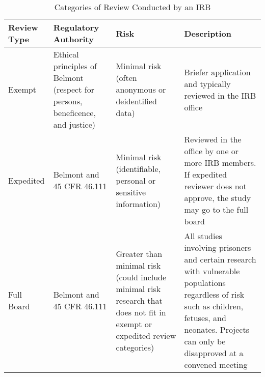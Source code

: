 \begin{table}

\caption{\label{tab:}Categories of Review Conducted by an IRB}
\centering
\begin{tabulary}{\ourtablewidth}{lLLL}
\hline
Review Type & Regulatory Authority & Risk & Description\\
\hline
Exempt & Ethical principles of Belmont (respect for persons, beneficence, and justice) & Minimal risk (often anonymous or deidentified data) & Briefer application and typically reviewed in the IRB office\\
\hline
Expedited & Belmont and 45 CFR 46.111 & Minimal risk (identifiable, personal or sensitive information) & Reviewed in the office by one or more IRB members. If expedited reviewer does not approve, the study may go to the full board\\
\hline
Full Board & Belmont and 45 CFR 46.111 & Greater than minimal risk (could include minimal risk research that does not fit in exempt or expedited review categories) & All studies involving prisoners and certain research with vulnerable populations regardless of risk such as children, fetuses, and neonates. Projects can only be disapproved at a convened meeting\\
\hline
\end{tabulary}
\end{table}